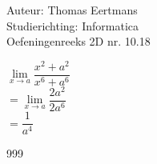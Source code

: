 \documentclass[a4paper]{article}
\begin{document}
  
\noindent \large Auteur: Thomas Eertmans \\
\noindent \large Studierichting: Informatica\\
\noindent \large Oefeningenreeks 2D nr. 10.18\\

\medskip

\normalsize

$\lim\limits_{x\rightarrow a} \dfrac{x^2+a^2}{x^6+a^6}$ \\

$= \lim\limits_{x\rightarrow a} \dfrac{2a^2}{2a^6}$ \\

$= \dfrac{1}{a^4}$ \\

\begin{thebibliography}{999}
\end{thebibliography}
\end{document}
